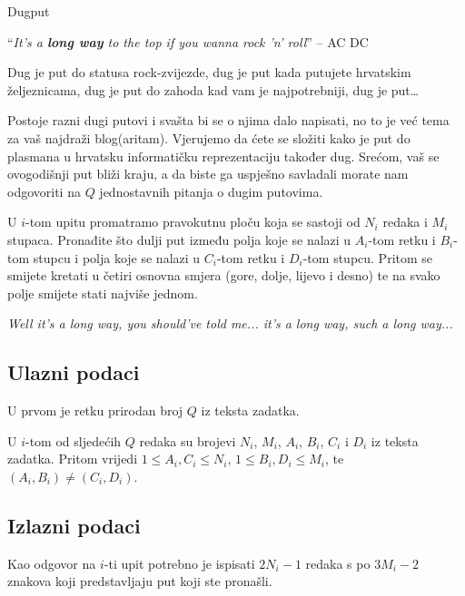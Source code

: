 \begin{statement}[
  problempoints=100,
  timelimit=1 sekunda,
  memorylimit=512 MiB,
]{Dugput}

``\textit{It's a \textbf{long way} to the top if you wanna rock 'n' roll}'' -- AC \text{\Lightning} DC

Dug je put do statusa rock-zvijezde, dug je put kada putujete hrvatskim
željeznicama, dug je put do zahoda kad vam je najpotrebniji, dug je put\ldots

Postoje razni dugi putovi i svašta bi se o njima dalo napisati, no to je već
tema za vaš najdraži blog(aritam). Vjerujemo da ćete se složiti kako je put do
plasmana u hrvatsku informatičku reprezentaciju također dug. Srećom, vaš se
ovogodišnji put bliži kraju, a da biste ga uspješno savladali morate nam
odgovoriti na $Q$ jednostavnih pitanja o dugim putovima.

U $i$-tom upitu promatramo pravokutnu ploču koja se sastoji od $N_i$ redaka i
$M_i$ stupaca.  Pronađite što dulji put između polja koje se nalazi u
$A_i$-tom retku i $B_i$-tom stupcu i polja koje se nalazi u $C_i$-tom retku i
$D_i$-tom stupcu. Pritom se smijete kretati u četiri osnovna smjera (gore,
dolje, lijevo i desno) te na svako polje smijete stati najviše jednom.

\text{\twonotes} \textit{Well it's a long way, you should've told me... it's a long way, such a long way...}
\text{\eighthnote} \text{\twonotes}
\subsection*{Ulazni podaci}
U prvom je retku prirodan broj $Q$ iz teksta zadatka.

U $i$-tom od sljedećih $Q$ redaka su brojevi $N_i$, $M_i$, $A_i$, $B_i$, $C_i$ i 
$D_i$ iz teksta zadatka. Pritom vrijedi $1 \leq A_i, C_i \leq N_i$, $1 \leq B_i, D_i \leq M_i$, te $(A_i, B_i) \neq (C_i, D_i)$.

\subsection*{Izlazni podaci}
Kao odgovor na $i$-ti upit potrebno je ispisati $2N_i-1$ redaka s po $3M_i-2$
znakova koji predstavljaju put koji ste pronašli.


\end{statement}
